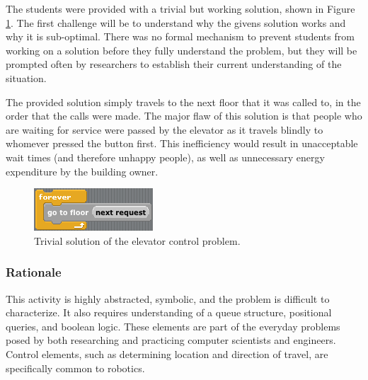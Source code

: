 	
	The students were provided with a trivial but working solution,
	shown in Figure \ref{fig:elevator-trivial}. The first challenge will
	be to understand why the givens solution works and why it is sub-optimal.
	There was no formal mechanism to prevent students from working
	on a solution before they fully understand the problem, but they will
	be prompted often by researchers to establish their current understanding
	of the situation.
	
	The provided solution simply travels to the next floor that it was
	called to, in the order that the calls were made. The major flaw of
	this solution is that people who are waiting for service were passed
	by the elevator as it travels blindly to whomever pressed the button
	first. This inefficiency would result in unacceptable wait times (and
	therefore unhappy people), as well as unnecessary energy expenditure
	by the building owner.
	
	\begin{figure}
	\begin{centering}
	\includegraphics{images/elevator-trivial-solution}
	\par\end{centering}
	
	\caption{\label{fig:elevator-trivial}Trivial solution of the elevator control
	problem.}
	
	
	
	\end{figure}
	
	
	
	\subsubsection{Rationale}
	
	This activity is highly abstracted, symbolic, and the problem is difficult
	to characterize. It also requires understanding of a queue structure,
	positional queries, and boolean logic. These elements are part of
	the everyday problems posed by both researching and practicing computer
	scientists and engineers. Control elements, such as determining location
	and direction of travel, are specifically common to robotics.




